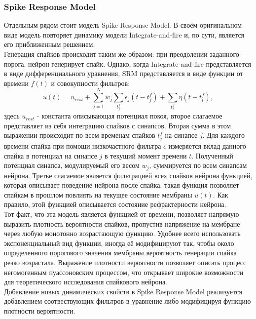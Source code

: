 \documentclass[a4paper,10pt]{article}
\begin{document}
\subsubsection{Spike Response Model}
\indent Отдельным рядом стоит модель Spike Response Model. В своём оригинальном виде модель повторяет динамику модели Integrate-and-fire и, по сути, является его приближенным решением.\\ 
\indent Генерация спайков происходит таким же образом: при преодолении заданного порога, нейрон генерирует спайк. Однако, когда Integrate-and-fire представляется в виде дифференциального уравнения, SRM представляется в виде функции от времени $f(t)$ и совокупности фильтров:
\begin{equation}\label{eq:srm}
u(t) = u_{rest} + \sum_{j=1}^N w_{j} \sum_{t^{f}_{j}} \epsilon_{j}(t-t^{f}_{j}) + \sum_{t^{f}_{i}}\eta(t-t^{f}_{i}),
\end{equation}
здесь $u_{rest}$ - константа описывающая потенциал покоя, второе слагаемое представляет из себя интеграцию спайков с синапсов. Вторая сумма в этом выражении происходит по всем временам спайков $t^{f}_{j}$ на синапсе $j$. Для каждого времени спайка при помощи низкочастного фильтра $\epsilon$ измеряется вклад данного спайка в потенциал на синапсе $j$ в текущий момент времени $t$. Полученный потенциал синапса, модулируемый его весом $w_{j}$, суммируется по всем синапсам нейрона. Третье слагаемое является фильтрацией всех спайков нейрона функцией, которая описывает поведение нейрона после спайка, такая функция позволяет спайкам в прошлом повлиять на текущее состояние мембраны $u(t)$. Как правило, этой функцией описывается состояние рефрактерности нейрона.\\
\indent Тот факт, что эта модель является функцией от времени, позволяет напрямую выразить плотность вероятности спайков, пропустив напряжение на мембране через любую монотонно возрастающую функцию. Удобнее всего использовать экспоненциальный вид функции, иногда её модифицируют так, чтобы около определенного порогового значения мембраны вероятность генерации спайка резко возрастала. Выражение плотности вероятности позволяет описать процесс негомогенным пуассоновским процессом, что открывает широкие возможности для теоретического исследования спайкового нейрона.\\
\indent Добавление новых динамических свойств в Spike Response Model реализуется добавлением соотвествующих фильтров в уравнение \cite{AdaptThesis} либо модифицируя функцию плотности вероятности\cite{TripleAdapt}. 
\end{document}
